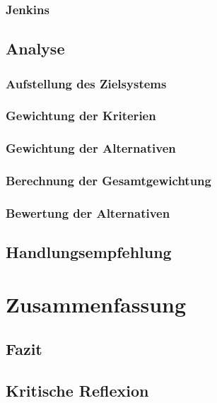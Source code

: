 \subsection{Jenkins}
\section{Analyse}
\subsection{Aufstellung des Zielsystems}
\subsection{Gewichtung der Kriterien}
\subsection{Gewichtung der Alternativen}
\subsection{Berechnung der Gesamtgewichtung}
\subsection{Bewertung der Alternativen}
\section{Handlungsempfehlung}
\chapter{Zusammenfassung}
\section{Fazit} 
\section{Kritische Reflexion}
